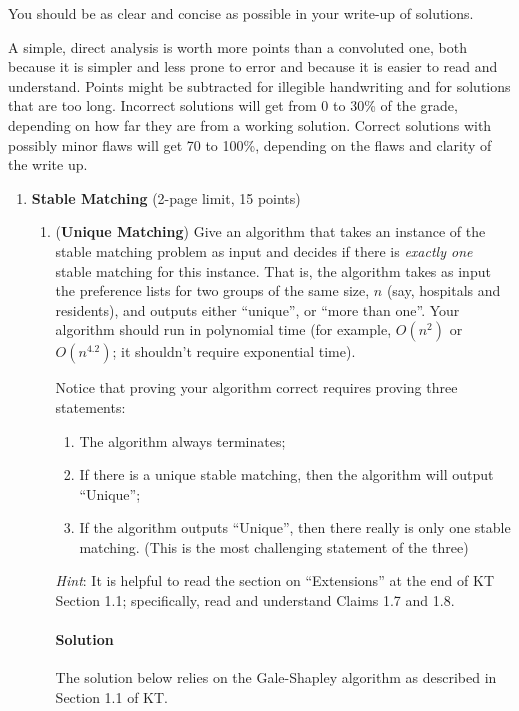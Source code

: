\documentclass[11pt]{article}
\begin{document}
You should be as clear and concise as possible in your write-up of
solutions. 

A simple, direct analysis is worth more points than a
convoluted one, both because it is simpler and less prone to error and
because it is easier to read and understand. Points might be
subtracted for illegible handwriting and for solutions that are too
long. Incorrect solutions will get from 0 to 30\% of the grade,
depending on how far they are from a working solution. Correct
solutions with possibly minor flaws will get 70 to 100\%, depending on
the flaws and clarity of the write up.

\newpage
\begin{enumerate}

  \item {\bf Stable Matching} (2-page limit, 15 points) 
\begin{enumerate}

\item ({\bf Unique Matching}) Give an algorithm that takes an instance of the stable
    matching problem as input and decides if there is {\em exactly
      one} stable matching for this instance. That is, the algorithm takes as input the preference lists for two groups of the same size, $n$ (say, hospitals and residents), and
    outputs either ``unique'', or ``more than one''. Your algorithm should run in polynomial time (for example, $O(n^2)$ or $O(n^{4.2})$; it shouldn't require exponential time).
    
    Notice that proving your algorithm correct requires proving three statements: 

    \begin{enumerate}
        \item The algorithm always terminates;
        \item If there is a unique stable matching, then the algorithm will output ``Unique'';
        \item If the algorithm outputs ``Unique'', then there really is only one stable matching. (This is the most challenging statement of the three)
    \end{enumerate}

    \emph{Hint}: It is helpful to read the section on ``Extensions'' at the
    end of KT Section 1.1; specifically, read and understand Claims 1.7 and 1.8.

    \color{teal}
    \paragraph*{Solution} The solution below relies on the Gale-Shapley algorithm as described in Section 1.1 of KT.
    

\end{enumerate}
\end{enumerate}
\end{document}

